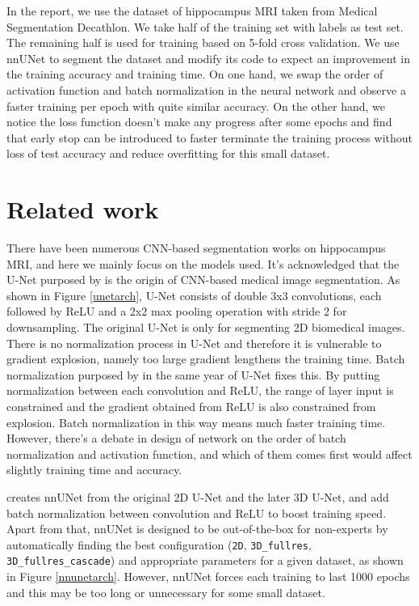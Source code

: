 \documentclass{article}
\begin{document}
In the report, we use the dataset of hippocampus MRI taken from Medical Segmentation Decathlon. We take half of the training set with labels as test set. The remaining half is used for training based on 5-fold cross validation. We use nnUNet to segment the dataset and modify its code to expect an improvement in the training accuracy and training time. On one hand, we swap the order of activation function and batch normalization in the neural network and observe a faster training per epoch with quite similar accuracy. On the other hand, we notice the loss function doesn't make any progress after some epochs and find that early stop can be introduced to faster terminate the training process without loss of test accuracy and reduce overfitting for this small dataset.


\section{Related work}

There have been numerous CNN-based segmentation works on hippocampus MRI, and here we mainly focus on the models used. It's acknowledged that the U-Net purposed by \citet{ronneberger2015u} is the origin of CNN-based medical image segmentation. As shown in Figure \ref{unetarch}, U-Net consists of double 3x3 convolutions, each followed by ReLU and a 2x2 max pooling operation with stride 2 for downsampling. The original U-Net is only for segmenting 2D biomedical images. There is no normalization process in U-Net and therefore it is vulnerable to gradient explosion, namely too large gradient lengthens the training time. Batch normalization purposed by \citet{ioffe2015batch} in the same year of U-Net fixes this. By putting normalization between each convolution and ReLU, the range of layer input is constrained and the gradient obtained from ReLU is also constrained from explosion. Batch normalization in this way means much faster training time. However, there's a debate in design of network on the order of batch normalization and activation function, and which of them comes first would affect slightly training time and accuracy.

\citet{isensee2021nnu} creates nnUNet from the original 2D U-Net and the later 3D U-Net, and add batch normalization between convolution and ReLU to boost training speed. Apart from that, nnUNet is designed to be out-of-the-box for non-experts by automatically finding the best configuration (\texttt{2D}, \texttt{3D\_fullres}, \texttt{3D\_fullres\_cascade}) and appropriate parameters for a given dataset, as shown in Figure \ref{nnunetarch}. However, nnUNet forces each training to last 1000 epochs and this may be too long or unnecessary for some small dataset.
\end{document}
